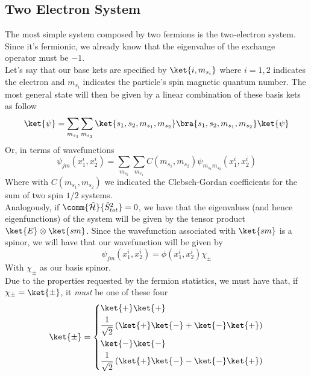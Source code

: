\documentclass[a4paper, 11pt]{book}
\newcommand{\1}{\opr{\mathds{1}}}
\newcommand{\ham}{\mathcal{H}}
\newcommand{\opr}[1]{\hat{#1}}
\theoremstyle{plain}
\begin{document}
	\subsection{Two Electron System}
	The most simple system composed by two fermions is the two-electron system. Since it's fermionic, we already know that the eigenvalue of the exchange operator must be $-1$.\\
	Let's say that our base kets are specified by $\ket{i,m_{s_i}}$ where $i=1,2$ indicates the electron and $m_{s_i}$ indicates the particle's spin magnetic quantum number. The most general state will then be given by a linear combination of these basis kets as follow
	\begin{equation*}
		\ket{\psi}=\sum_{m_{s_1}}\sum_{m_{s_2}}\ket{s_1,s_2,m_{s_1},m_{s_2}}\bra{s_1,s_2,m_{s_1},m_{s_2}}\ket{\psi}
	\end{equation*}
	Or, in terms of wavefunctions
	\begin{equation*}
		\psi_{jm}(x^i_1,x^i_2)=\sum_{m_{s_2}}\sum_{m_{s_1}}C(m_{s_1},m_{s_2})\psi_{m_{s_1}m_{s_2}}(x^i_1,x^i_2)
	\end{equation*}
	Where with $C(m_{s_1},m_{s_2})$ we indicated the Clebsch-Gordan coefficients for the sum of two spin $1/2$ systems.\\
	Analogously, if $\comm{\opr{\ham}}{\opr{S}^2_{tot}}=0$, we have that the eigenvalues (and hence eigenfunctions) of the system will be given by the tensor product $\ket{E}\otimes\ket{sm}$. Since the wavefunction associated with $\ket{sm}$ is a spinor, we will have that our wavefunction will be given by
	\begin{equation*}
		\psi_{jm}(x^i_1,x^i_2)=\phi(x_1^i,x_2^i)\chi_{\pm}
	\end{equation*}
	With $\chi_{\pm}$ as our basis spinor.\\
	Due to the properties requested by the fermion statistics, we must have that, if $\chi_{\pm}=\ket{\pm}$, it \emph{must} be one of these four
	\begin{equation}
		\begin{aligned}
			\ket{\pm}=\left\{ \begin{aligned}
					&\ket{+}\ket{+}\\
					&\frac{1}{\sqrt{2}}\left( \ket{+}\ket{-}+\ket{-}\ket{+} \right)\\
					&\ket{-}\ket{-}\\
					&\frac{1}{\sqrt{2}}\left( \ket{+}\ket{-}-\ket{-}\ket{+} \right)
				\end{aligned}
				\right.
		\end{aligned}
		\label{eq:tripletsingletstates}
	\end{equation}
\end{document}
